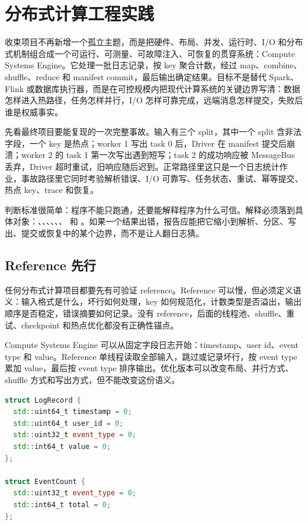 \chapter{分布式计算工程实践}

收束项目不再新增一个孤立主题，而是把硬件、布局、并发、运行时、I/O 和分布式机制组合成一个可运行、可测量、可故障注入、可恢复的贯穿系统：Compute Systems Engine。它处理一批日志记录，按 key 聚合计数，经过 map、combine、shuffle、reduce 和 manifest commit，最后输出确定结果。目标不是替代 Spark、Flink 或数据库执行器，而是在可控规模内把现代计算系统的关键边界写清：数据怎样进入热路径，任务怎样并行，I/O 怎样可靠完成，远端消息怎样提交，失败后谁是权威事实。

先看最终项目要能复现的一次完整事故。输入有三个 split，其中一个 split 含非法字段，一个 key 是热点；worker 1 写出 task 0 后，Driver 在 manifest 提交后崩溃；worker 2 的 task 1 第一次写出遇到短写；task 2 的成功响应被 MessageBus 丢弃，Driver 超时重试，旧响应随后迟到。正常路径里这只是一个日志统计作业，事故路径里它同时考验解析错误、I/O 可靠写、任务状态、重试、幂等提交、热点 key、trace 和恢复。

判断标准很简单：程序不能只跑通，还要能解释程序为什么可信。解释必须落到具体对象：、、、、、、 和 。如果一个结果出错，报告应能把它缩小到解析、分区、写出、提交或恢复中的某个边界，而不是让人翻日志猜。

\section{Reference 先行}

任何分布式计算项目都要先有可验证 reference。Reference 可以慢，但必须定义语义：输入格式是什么，坏行如何处理，key 如何规范化，计数类型是否溢出，输出顺序是否稳定，错误摘要如何记录。没有 reference，后面的线程池、shuffle、重试、checkpoint 和热点优化都没有正确性锚点。

Compute Systems Engine 可以从固定字段日志开始：timestamp、user id、event type 和 value。Reference 单线程读取全部输入，跳过或记录坏行，按 event type 累加 value，最后按 event type 排序输出。优化版本可以改变布局、并行方式、shuffle 方式和写出方式，但不能改变这份语义。

\begin{lstlisting}[language=C++,caption={Reference 使用的稳定数据合同}]
struct LogRecord {
  std::uint64_t timestamp = 0;
  std::uint64_t user_id = 0;
  std::uint32_t event_type = 0;
  std::int64_t value = 0;
};

struct EventCount {
  std::uint32_t event_type = 0;
  std::int64_t total = 0;
};
\end{lstlisting}

